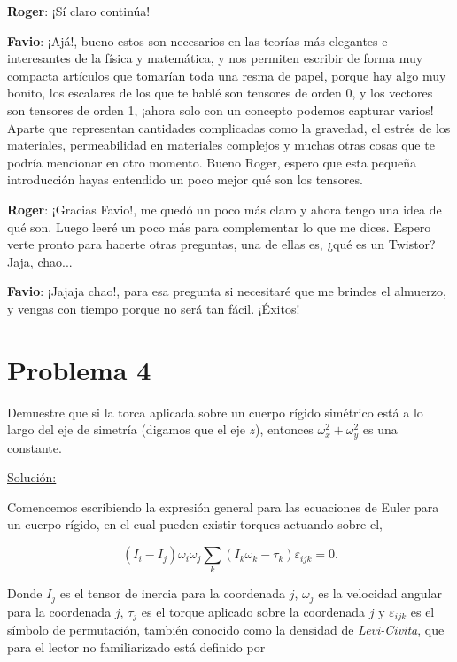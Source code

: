 \documentclass[a4paper,10pt]{article}
\numberwithin{equation}{section}
\begin{document}
\textbf{\color{green}Roger}: ¡Sí claro continúa!

\textbf{\color{blue}Favio}: ¡Ajá!, bueno estos son necesarios en las teorías 
más elegantes e interesantes de la física y matemática, y nos permiten escribir de forma
muy compacta artículos que tomarían toda una resma de papel, porque hay algo muy bonito,
los escalares de los que te hablé son tensores de orden 0, y los vectores son 
tensores de orden 1, ¡ahora solo con un concepto podemos capturar varios! Aparte que representan cantidades
complicadas como la gravedad, el estrés de los materiales, permeabilidad en materiales 
complejos y muchas otras cosas que te podría mencionar en otro momento. Bueno Roger, espero
que esta pequeña introducción hayas entendido un poco mejor qué son los tensores.

\textbf{\color{green}Roger}: ¡Gracias Favio!, me quedó un poco más claro y ahora tengo una
idea de qué son. Luego leeré un poco más para complementar lo que me dices. Espero 
verte pronto para hacerte otras preguntas, una de ellas es, ¿qué es un Twistor? Jaja,
chao...

\textbf{\color{blue}Favio}: ¡Jajaja chao!, para esa pregunta si necesitaré que me brindes 
el almuerzo, y vengas con tiempo porque no será tan fácil. ¡Éxitos!

\section{Problema 4}

Demuestre que si la torca aplicada sobre un cuerpo rígido simétrico está a lo largo 
del eje de simetría (digamos que el eje $z$), entonces $\omega_x^2 + \omega_y^2$ es 
una constante.

\vspace{.3cm}

\underline{Solución:} \vspace{.3cm}

Comencemos escribiendo la expresión general para las ecuaciones de Euler para un 
cuerpo rígido, en el cual pueden existir torques actuando sobre el,

\begin{equation}
 (I_i - I_j) \omega_i \omega_j \sum_k (I_k\dot{\omega_k}- \tau_k) \varepsilon_{ijk} = 0.
\end{equation}

Donde $I_j$ es el tensor de inercia para la coordenada $j$, $\omega_j$ es la velocidad
angular para la coordenada $j$, $\tau_j$ es el torque aplicado sobre la coordenada 
$j$ y $\varepsilon_{ijk}$ es el símbolo de permutación, también conocido como la 
densidad de \emph{Levi-Civita}, que para el lector no familiarizado está definido 
por 
\end{document}
